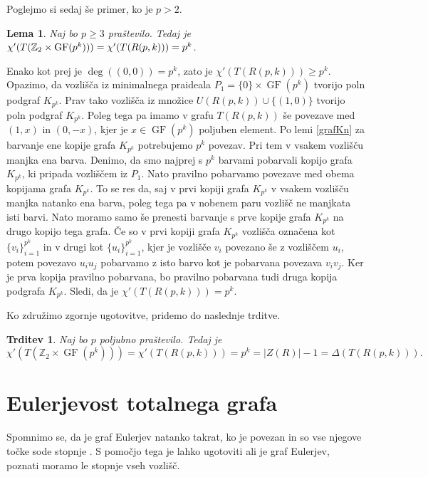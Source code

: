 \documentclass[a4paper, 12pt]{amsart}
\theoremstyle{definition} %
\theoremstyle{plain} %
\newtheorem{lema}[definicija]{Lema}
\newtheorem{trditev}[definicija]{Trditev}
\newcommand{\Z}{\mathbb Z}
\DeclareMathOperator{\GF}{GF}
\begin{document}
Poglejmo si sedaj še primer, ko je $p> 2$.

\begin{lema}
Naj bo $p\ge 3$ praštevilo. Tedaj je $\chi'(T(\Z_2 \times \GF(p^k))) = \chi'(T(R(p,k))) \\= p^k$.
\end{lema}

\proof
Enako kot prej je $\deg((0,0)) = p^k$, zato je $\chi'(T(R(p,k))) \ge p^k$. Opazimo, da vozlišča iz minimalnega praideala $P_1 = \{0\} \times \GF(p^k)$ tvorijo poln podgraf $K_{p^k}$. Prav tako vozlišča iz množice $U(R(p,k)) \cup \{(1,0)\}$ tvorijo poln podgraf $K_{p^k}$. Poleg tega pa imamo v grafu $T(R(p,k))$ še povezave med $(1,x)$ in $(0,-x)$, kjer je $x\in \GF(p^k)$ poljuben element. Po lemi \ref{grafKn} za barvanje ene kopije grafa $K_{p^k}$ potrebujemo $p^k$ povezav. Pri tem v vsakem vozlišču manjka ena barva. Denimo, da smo najprej s $p^k$ barvami pobarvali kopijo grafa $K_{p^k}$, ki pripada vozliščem iz $P_1$. Nato pravilno pobarvamo povezave med obema kopijama grafa $K_{p^k}$. To se res da, saj v prvi kopiji grafa $K_{p^k}$ v vsakem vozlišču manjka natanko ena barva, poleg tega pa v nobenem paru vozlišč ne manjkata isti barvi. Nato moramo samo še prenesti barvanje s prve kopije grafa $K_{p^k}$ na drugo kopijo tega grafa. Če so v prvi kopiji grafa $K_{p^k}$ vozlišča označena kot $\{v_i\}_{i=1}^{p^k}$ in v drugi kot $\{u_i\}_{i=1}^{p^k}$, kjer je vozlišče $v_i$ povezano še z vozliščem $u_i$, potem povezavo $u_i u_j$ pobarvamo z isto barvo kot je pobarvana povezava $v_i v_j$. Ker je prva kopija pravilno pobarvana, bo pravilno pobarvana tudi druga kopija podgrafa $K_{p^k}$. Sledi, da je $\chi'(T(R(p,k))) = p^k$.
\endproof

Ko združimo zgornje ugotovitve, pridemo do naslednje trditve.

\begin{trditev}
Naj bo $p$ poljubno praštevilo. Tedaj je 
$$
\chi'(T(\Z_2 \times \GF(p^k))) = \chi'(T(R(p,k))) = p^k = |Z(R)| - 1 = \Delta(T(R(p,k))).
$$
\end{trditev}

\section{Eulerjevost totalnega grafa}
Spomnimo se, da je graf Eulerjev natanko takrat, ko je povezan in so vse njegove točke sode stopnje \cite[Theorem 1.8.1]{Diestel}. S pomočjo tega je lahko ugotoviti ali je graf Eulerjev, poznati moramo le stopnje vseh vozlišč. 
\end{document}
